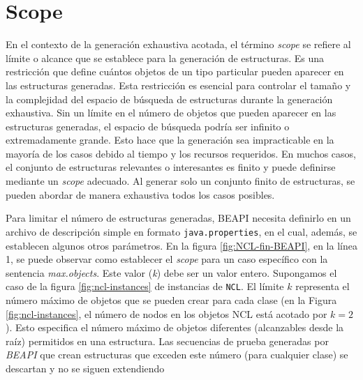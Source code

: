 \section{Scope}
\label{sec:scope}



En el contexto de la generación exhaustiva acotada, el término \emph{scope} se refiere al límite o alcance que se establece para la generación de estructuras. 
Es una restricción que define cuántos objetos de un tipo particular pueden aparecer en las estructuras generadas. 
Esta restricción es esencial para controlar el tamaño y la complejidad del espacio de búsqueda de estructuras durante 
la generación exhaustiva. Sin un límite en el número de objetos que pueden aparecer en las estructuras generadas,
 el espacio de búsqueda podría ser infinito o extremadamente grande. Esto hace que la generación sea impracticable en la mayoría de los casos debido al tiempo 
 y los recursos requeridos.  En muchos casos, el conjunto de estructuras relevantes o interesantes es finito y puede definirse mediante un \emph{scope} adecuado.
 Al generar solo un conjunto finito de estructuras, se pueden abordar de manera exhaustiva todos los casos posibles.

Para limitar el número de estructuras generadas, BEAPI necesita definirlo en un archivo de descripción simple en formato \texttt{java.properties}, 
en el cual, además, se establecen algunos otros parámetros. En la figura \ref{fig:NCL-fin-BEAPI}, en la línea 1, se puede observar como establecer 
el \emph{scope} para un caso específico con la sentencia \emph{max.objects}. Este valor (\emph{k}) debe ser un valor entero. Supongamos el caso de 
la figura \ref{fig:ncl-instances} de instancias de \texttt{NCL}.  El límite $k$ representa el número máximo de objetos que se pueden crear para cada 
clase (en la Figura \ref{fig:ncl-instances}, el número de nodos en los objetos NCL está acotado por $k=2$). Esto especifica el número máximo de objetos 
diferentes (alcanzables desde la raíz) permitidos en una estructura. Las secuencias de prueba generadas por \emph{BEAPI} que crean estructuras que 
exceden este número (para cualquier clase) se descartan y no se siguen extendiendo


